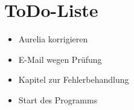 \section*{ToDo-Liste}
\begin{itemize}
\item Aurelia korrigieren
\item E-Mail wegen Prüfung
\item Kapitel zur Fehlerbehandlung
\item Start des Programms
\end{itemize}